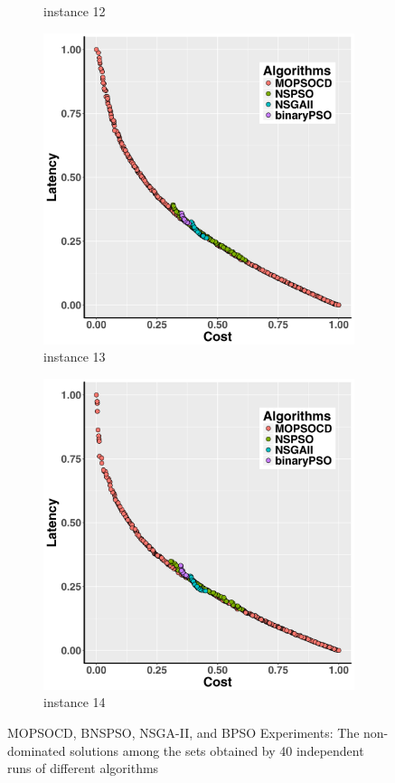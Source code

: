 \documentclass[10pt,journal,compsoc]{IEEEtran}
\begin{document}
\begin{figure}[ht]
\begin{subfigure}{0.21\linewidth}
    \caption{instance 12}
   \end{subfigure}
      \begin{subfigure}{0.21\linewidth}
       \includegraphics[width=\textwidth]{pics/total13.png}
    \caption{instance 13}
   \end{subfigure}
      \begin{subfigure}{0.21\linewidth}
       \includegraphics[width=\textwidth]{pics/total14.png}
    \caption{instance 14}
   \end{subfigure}
   \caption{MOPSOCD, BNSPSO, NSGA-II, and BPSO Experiments: The non-dominated solutions
among the sets obtained by 40 independent runs of different algorithms}

   \label{fig:total}
\end{figure}
\end{document}
